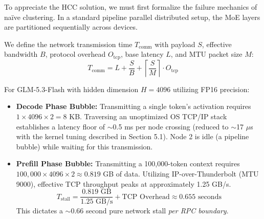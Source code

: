 \documentclass[11pt,a4paper]{article}
\begin{document}
To appreciate the HCC solution, we must first formalize the failure mechanics of na\"ive clustering. In a standard pipeline parallel distributed setup, the MoE layers are partitioned sequentially across devices.

We define the network transmission time $T_{\text{comm}}$ with payload $S$, effective bandwidth $B$, protocol overhead $O_{\text{tcp}}$, base latency $L$, and MTU packet size $M$:
\begin{equation}
    T_{\text{comm}} = L + \frac{S}{B} + \left\lceil \frac{S}{M} \right\rceil \cdot O_{\text{tcp}}
\end{equation}

For GLM-5.3-Flash with hidden dimension $H = 4096$ utilizing FP16 precision:
\begin{itemize}
    \item \textbf{Decode Phase Bubble:} Transmitting a single token's activation requires $1 \times 4096 \times 2 = 8$ KB. Traversing an unoptimized OS TCP/IP stack establishes a latency floor of $\sim$0.5 ms per node crossing \cite{geerling2025} (reduced to $\sim$17 $\mu$s with the kernel tuning described in Section 5.1). Node 2 is idle (a pipeline bubble) while waiting for this transmission.

    \item \textbf{Prefill Phase Bubble:} Transmitting a 100,000-token context requires $100,000 \times 4096 \times 2 \approx 0.819$ GB of data. Utilizing IP-over-Thunderbolt (MTU 9000), effective TCP throughput peaks at approximately 1.25 GB/s.
    \begin{equation}
        T_{\text{stall}} = \frac{0.819 \text{ GB}}{1.25 \text{ GB/s}} + \text{TCP Overhead} \approx 0.655 \text{ seconds}
    \end{equation}
    This dictates a $\sim$0.66 second pure network stall \textit{per RPC boundary}.
\end{itemize}
\end{document}
